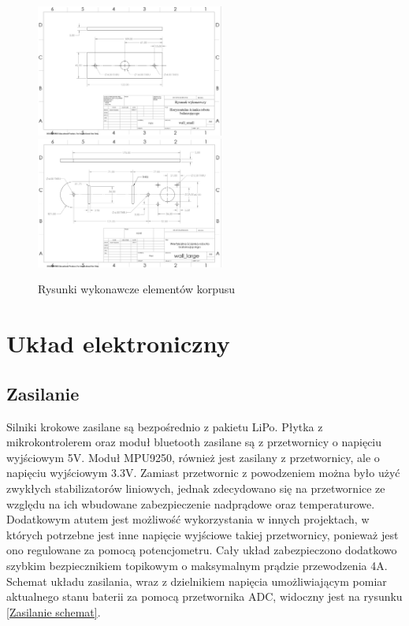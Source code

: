 \begin{figure}[h!]
    \centering
    \includegraphics[width=0.55\textwidth]{Rysunki/Rozdzial05/smallWall.png}
    \includegraphics[width=0.55\textwidth]{Rysunki/Rozdzial05/bigWall.png}
    \caption{Rysunki wykonawcze elementów korpusu}
    \label{rysunki wykonawcze}
\end{figure}

\section{Układ elektroniczny}

\subsection{Zasilanie}

Silniki krokowe zasilane są bezpośrednio z pakietu LiPo. Płytka z mikrokontrolerem oraz moduł bluetooth zasilane są z przetwornicy o napięciu wyjściowym 5V. Moduł MPU9250, również jest zasilany z przetwornicy, ale o napięciu wyjściowym 3.3V. Zamiast przetwornic z powodzeniem można było użyć zwykłych stabilizatorów liniowych, jednak zdecydowano się na przetwornice ze względu na ich wbudowane zabezpieczenie nadprądowe oraz temperaturowe. Dodatkowym atutem jest możliwość wykorzystania w innych projektach, w których potrzebne jest inne napięcie wyjściowe takiej przetwornicy, ponieważ jest ono regulowane za pomocą potencjometru. Cały układ zabezpieczono dodatkowo szybkim bezpiecznikiem topikowym o maksymalnym prądzie przewodzenia 4A. Schemat układu zasilania, wraz z dzielnikiem napięcia umożliwiającym pomiar aktualnego stanu baterii za pomocą przetwornika ADC, widoczny jest na rysunku \ref{Zasilanie schemat}.

